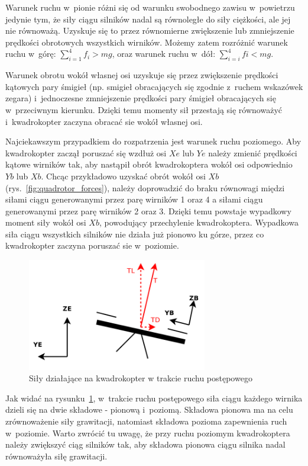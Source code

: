 Warunek ruchu w~pionie różni się od warunku swobodnego zawisu w~powietrzu jedynie tym, że siły ciągu silników nadal są równoległe do siły ciężkości, ale jej nie równoważą. Uzyskuje się to przez równomierne zwiększenie lub zmniejszenie prędkości obrotowych wszystkich wirników. Możemy zatem rozróżnić warunek ruchu w~górę: $\sum_{i=1}^{4} f_i > mg$, oraz warunek ruchu w~dół: $\sum_{i=i}^{4} fi < mg$.

Warunek obrotu wokół własnej osi uzyskuje się przez zwiększenie prędkości kątowych pary śmigieł (np. smigieł obracających się zgodnie z~ruchem wskazówek zegara) i~jednoczesne zmniejszenie prędkości pary śmigieł obracających się w~przeciwnym kierunku. Dzięki temu momenty sił przestają się równoważyć i~kwadrokopter zaczyna obracać sie wokół własnej osi.

Najciekawszym przypadkiem do rozpatrzenia jest warunek ruchu poziomego. Aby kwadrokopter zaczął poruszać się wzdłuż osi $Xe$ lub $Ye$ należy zmienić prędkości kątowe wirników tak, aby nastąpił obrót kwadrokoptera wokół osi odpowiednio $Yb$ lub $Xb$. Chcąc przykładowo uzyskać obrót wokół osi $Xb$ (rys.~\ref{fig:quadrotor_forces}), należy doprowadzić do braku równowagi międzi siłami ciągu generowanymi przez parę wirników 1 oraz 4 a siłami ciągu generowanymi przez parę wirników 2 oraz 3. Dzięki temu powstaje wypadkowy moment siły wokół osi $Xb$, powodujący przechylenie kwadrokoptera. Wypadkowa siła ciągu wszystkich silników nie działa już pionowo ku górze, przez co kwadrokopter zaczyna poruszać sie w~poziomie. 

\begin{figure}[H]
	\centering
	\includegraphics[width=0.7\textwidth]{Pictures/quadrotor_drag_force.png}
	\caption[Dynamika ruchu postępowego]{Siły działające na kwadrokopter w trakcie ruchu postępowego}
	\label{fig:quadrotor_drag_force.png}
\end{figure}


Jak widać na rysunku~\ref{fig:quadrotor_drag_force.png}, w~trakcie ruchu postępowego siła ciągu każdego wirnika dzieli się na dwie składowe - pionową i~poziomą. Składowa pionowa ma na celu zrównoważenie siły grawitacji, natomiast składowa pozioma zapewnienia ruch w~poziomie. Warto zwrócić tu uwagę, że przy ruchu poziomym kwadrokoptera należy zwiększyć ciąg silników tak, aby składowa pionowa ciągu silnika nadal równoważyła siłę grawitacji.

